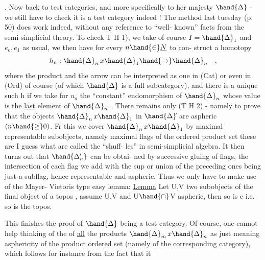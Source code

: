 .  Now back to test categories,  and more specifically to her majesty
$\hand{\Delta}$ -  we still have to check it is a test category indeed !  The method 
\margin{$\downarrow$}last tuesday (p. 50) does work indeed,  without any reference to ``well-
known'' facts from the semi-simplicial theory.  To check  T H 1),  we take
of course $I = \hand{\Delta}_1$ and $e_o , e_1$ as usual,  we then have for every $n \hand{\in} \underline{N}$ to con-
struct a homotopy 
\[ h_n : \hand{\Delta}_n \, x \hand{\Delta}_1 \hand{\rightarrow} \hand{\Delta}_n \quad , \]
where the product and the arrow can be interpreted as one in (Cat) or even
in (Ord) of course  (of which $\hand{\Delta}$ is a full subcategory),  and there is a
unique such h if we take for $u_a$ the ``constant'' endomorphism of $\hand{\Delta}_n$ whose
\margin{*}value is the \uline{last} element of $\hand{\Delta}_n$ \hand{(*)}. There remains only (T H 2) - namely
to prove that the objects $\hand{\Delta}_n \, x \hand{\Delta}_1$ in $\hand{\Delta}\hat{}$ are aspheric $(n \hand{\geq} 0)$.  Fr this
we cover  $\hand{\Delta}_n \, x \hand{\Delta}_1$ by maximal representable subobjects,  namely maximal flags
of the ordered product set\hand{(}  these are I guess what are called the ``shuff-
les'' in semi-simplicial algebra\hand{)}. It then turns out that $\hand{\Delta'_n}$ can be obtai-
ned by successive gluing of flags,  the intersection of each flag we add
with the sup or union of the preceding ones being just a subflag,  hence
representable and aspheric.  Thus we only have to make use of the Mayer-
Vietoris type easy lemma:
\uline{Lemma}  Let  U,V two subobjects of the final object  of a topos ,  assume
U,V and U$\hand{\cap}$V aspheric,  then so is e\hand{,} i.e. so is the topos.

This finishes the proof of $\hand{\Delta}$ being a test category.  Of course,  one
cannot help thinking of the   of \uline{all} the products $\hand{\Delta}_m \, x \hand{\Delta}_n$
as just meaning asphericity of the product ordered set (namely of the
corresponding category),  which follows for instance from the fact that it
